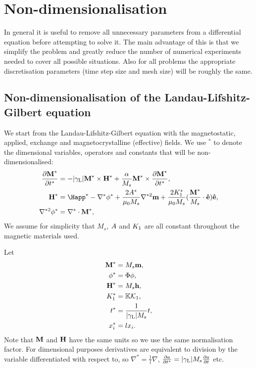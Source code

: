 \section{Non-dimensionalisation}
\label{sec:normalisations-appendix}

In general it is useful to remove all unnecessary parameters from a differential equation before attempting to solve it.
The main advantage of this is that we simplify the problem and greatly reduce the number of numerical experiments needed to cover all possible situations.
Also for all problems the appropriate discretisation parameters (time step size and mesh size) will be roughly the same.

\subsection{Non-dimensionalisation of the Landau-Lifshitz-Gilbert equation}
\label{sec:land-lifsh-gilb-normalisation}

We start from the Landau-Lifshitz-Gilbert equation with the magnetostatic, applied, exchange and magnetocrystalline (effective) fields. We use $^*$ to denote the dimensional variables, operators and constants that will be non-dimensionalised:
\begin{align}
  \pd{\Mv^*}{t^*} &= - \gymagc \Mv^* \times \Hv^* + \frac{\alpha}{M_s} \Mv^* \times \pd{\Mv^*}{t^*},
                    \label{eqn:llgnd} \\
  \Hv^* &= \Happ^* - \grad^* \phi^* + \frac{2\Exchc^*}{\mu_0 M_s} \nabla^{*2} \mv + \frac{2\Kone^*}{\mu_0 M_s} (\frac{\Mv^*}{M_s} \cdot \ev) \ev,
          \label{eqn:effnd} \\
  \nabla^{*2} \phi^* &= \grad^* \cdot \Mv^*,
                       \label{eqn:phind}
\end{align}
We assume for simplicity that $M_s$, $A$ and $K_1$ are all
constant throughout the magnetic materials used.

Let
\begin{equation}
  \label{eqn:nddefs}
  \begin{aligned}
    \boldsymbol{\mathrm{M}}^* &= M_s \boldsymbol{\mathrm{m}},  \\
    \phi^* &= \Phi \phi,  \\
    \boldsymbol{\mathrm{H}}^* &= M_s \boldsymbol{\mathrm{h}},  \\
    K_1^* &= \mathbb{K} \mathcal{K}_1,  \\
    t^* &= \frac{1}{{\left|{\gamma_{\mathrm{\tiny{L}}}} \right|} M_s} t,  \\
    x_i^* &= l x_i.
  \end{aligned}
\end{equation}
Note that $\boldsymbol{\mathrm{M}}$ and $\boldsymbol{\mathrm{H}}$ have the same units so we use the same normalisation factor. For dimensional purposes derivatives are equivalent to division by the variable differentiated with respect to, so $\nabla^* = \frac{1}{l} \nabla$, $\frac{\partial a}{\partial t^*} = {\left|{\gamma_{\mathrm{\tiny{L}}}} \right|} M_s \frac{\partial a}{\partial t}$ etc.

